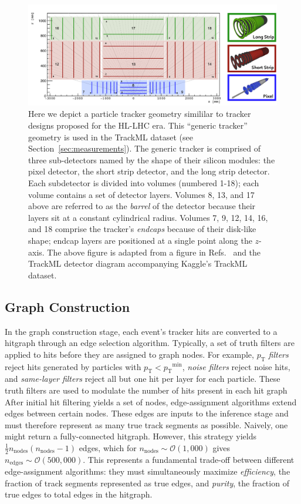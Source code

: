 \documentclass[twocolumn]{svjour3}
\newcommand{\pt}{\ensuremath{p_{\mathrm{T}}}\xspace}
\newcommand{\nnodes}{\ensuremath{n_\mathrm{nodes}\xspace}}
\newcommand{\nedges}{\ensuremath{n_\mathrm{edges}\xspace}}
\begin{document}
\begin{figure}[!htbp]
\centering
\captionsetup{labelfont=bf}
\includegraphics[width=0.99\columnwidth,clip]{pixel_detector.pdf}
\caption{Here we depict a particle tracker geometry simililar to tracker designs proposed for the HL-LHC era. 
This ``generic tracker'' geometry is used in the TrackML dataset (see Section~\ref{sec:measurements}). The generic tracker is comprised of three sub-detectors named by the shape of their silicon modules: the pixel detector, the short strip detector, and the long strip detector. 
Each subdetector is divided into volumes (numbered 1-18); each volume contains a set of detector layers. Volumes 8, 13, and 17 above are referred to as the \textit{barrel} of the detector because their layers sit at a constant cylindrical radius. 
Volumes 7, 9, 12, 14, 16, and 18 comprise the tracker's \textit{endcaps} because of their disk-like shape; endcap layers are positioned at a single point along the $z$-axis. The above figure is adapted from a figure in Refs.~\cite{TrackML} and the TrackML detector diagram accompanying Kaggle's TrackML dataset.}
\label{fig:pixel} 
\end{figure}
 
\subsection{Graph Construction}
\label{sec:Graph}
In the graph construction stage, each event's tracker hits are converted to a hitgraph through an edge selection algorithm. 
Typically, a set of truth filters are applied to hits before they are assigned to graph nodes. 
For example, \textit{$\pt$ filters} reject hits generated by particles with $\pt<\pt^\mathrm{min}$, \textit{noise filters} reject noise hits, and \textit{same-layer filters} reject all but one hit per layer for each particle. 
These truth filters are used to modulate the number of hits present in each hit graph
After initial hit filtering yields a set of nodes, edge-assignment algorithms extend edges between certain nodes. 
These edges are inputs to the inference stage and must therefore represent as many true track segments as possible. 
Naively, one might return a fully-connected hitgraph. 
However, this strategy yields $\frac{1}{2}\nnodes(\nnodes-1)$ edges, which for $\nnodes\sim\mathcal{O}(1,000)$ gives $\nedges\sim\mathcal{O}(500,000)$. 
This represents  a fundamental trade-off between different edge-assignment algorithms: they must simultaneously maximize \textit{efficiency}, the fraction of track segments represented as true edges, and \textit{purity}, the fraction of true edges to total edges in the hitgraph.
\end{document}
